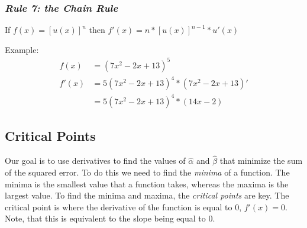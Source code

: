\documentclass[11pt,openany]{book}\usepackage[]{graphicx}\usepackage[]{color}
\begin{document}
\subsubsection{\textit{Rule 7: the Chain Rule}}

\begin{center}
   If $f(x)=[u(x)]^{n}$ then $f'(x)=n*[u(x)]^{n-1}*u'(x)$ 
  \end{center}
\noindent Example: 
\begin{align*}
f(x) &= (7x^{2}-2x+13)^{5} \\ 
f'(x)&=5(7x^{2}-2x+13)^{4}*(7x^{2}-2x+13)' \\
&=5(7x^{2}-2x+13)^{4}*(14x-2)
\end{align*}

\subsection{Critical Points}

Our goal is to use derivatives to find the values of $\hat{\alpha}$ and $\hat{\beta}$ that minimize the sum of the squared error. To do this we need to find the \textit{minima} of a function. The minima is the smallest value that a function takes, whereas the maxima is the largest value. To find the minima and maxima, the \textit{critical points} are key. The critical point is where the derivative of the function is equal to $0$, $f'(x)=0$. Note, that this is equivalent to the slope being equal to $0$. 

\begin{grbox}
\end{grbox}
\end{document}
